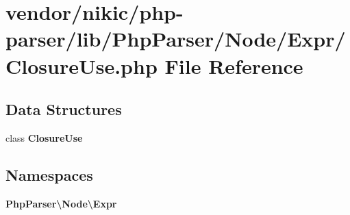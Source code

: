 \section{vendor/nikic/php-\/parser/lib/\+Php\+Parser/\+Node/\+Expr/\+Closure\+Use.php File Reference}
\label{_closure_use_8php}
\subsection*{Data Structures}
\begin{DoxyCompactItemize}
\item 
class {\bf Closure\+Use}
\end{DoxyCompactItemize}
\subsection*{Namespaces}
\begin{DoxyCompactItemize}
\item 
 {\bf Php\+Parser\textbackslash{}\+Node\textbackslash{}\+Expr}
\end{DoxyCompactItemize}
